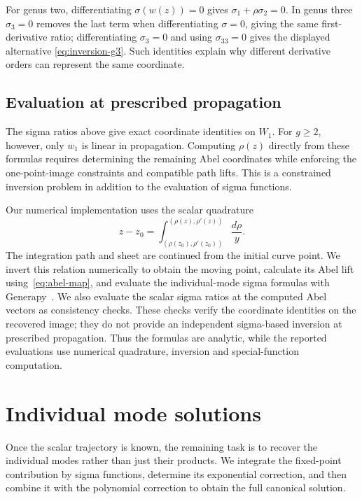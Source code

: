 \documentclass[11pt]{article}
\begin{document}
For genus two, differentiating $\sigma(w(z))=0$ gives $\sigma_1+\rho\sigma_2=0$. In genus three $\sigma_3=0$ removes the last term when differentiating $\sigma=0$, giving the same first-derivative ratio; differentiating $\sigma_3=0$ and using $\sigma_{33}=0$ gives the displayed alternative \eqref{eq:inversion-g3}. Such identities explain why different derivative orders can represent the same coordinate.

\subsection{Evaluation at prescribed propagation}\label{sec:scalar-evaluation}

The sigma ratios above give exact coordinate identities on $W_1$. For $g\ge2$, however, only $w_1$ is linear in propagation. Computing $\rho(z)$ directly from these formulas requires determining the remaining Abel coordinates while enforcing the one-point-image constraints and compatible path lifts. This is a constrained inversion problem in addition to the evaluation of sigma functions.

Our numerical implementation uses the scalar quadrature
\begin{equation}\label{eq:scalar-inverse-integral}
z-z_0=\int_{(\rho(z_0),\rho'(z_0))}^{(\rho(z),\rho'(z))}\frac{d\rho}{y}.
\end{equation}
The integration path and sheet are continued from the initial curve point. We invert this relation numerically to obtain the moving point, calculate its Abel lift using~\eqref{eq:abel-map}, and evaluate the individual-mode sigma formulas with Generapy~\cite{generapy}. We also evaluate the scalar sigma ratios at the computed Abel vectors as consistency checks. These checks verify the coordinate identities on the recovered image; they do not provide an independent sigma-based inversion at prescribed propagation. Thus the formulas are analytic, while the reported evaluations use numerical quadrature, inversion and special-function computation.

\section{Individual mode solutions}\label{sec:modes}

Once the scalar trajectory is known, the remaining task is to recover the individual modes rather than just their products. We integrate the fixed-point contribution by sigma functions, determine its exponential correction, and then combine it with the polynomial correction to obtain the full canonical solution.
\end{document}
